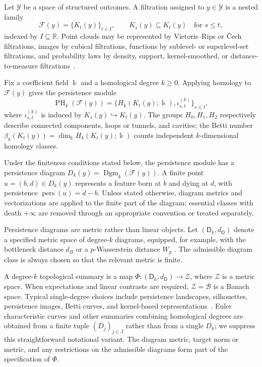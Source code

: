 \documentclass[11pt,a4paper]{article}
\theoremstyle{plain}
\theoremstyle{definition}
\theoremstyle{remark}
\newcommand{\1}{\mathbbm{1}}
\begin{document}
Let \(\mathcal Y\) be a space of structured outcomes. A filtration assigned to \(y\in\mathcal Y\) is a nested family
\[
\mathcal F(y)=\{K_t(y)\}_{t\in I},
\qquad
K_s(y)\subseteq K_t(y)\quad\text{for }s\leq t,
\]
indexed by \(I\subseteq\mathbb R\). Point clouds may be represented by Vietoris--Rips or \v{C}ech filtrations, images by cubical filtrations, functions by sublevel- or superlevel-set filtrations, and probability laws by density, support, kernel-smoothed, or distance-to-measure
filtrations~\citep{edelsbrunnerharer2010,oudot2015,
boissonnatchazalyvinec2018,chazalmichel2021}.

Fix a coefficient field \(\Bbbk\) and a homological degree \(k\geq0\). Applying homology to \(\mathcal F(y)\) gives the persistence module
\[
\operatorname{PH}_k(\mathcal F(y))
=
\bigl\{
H_k(K_t(y);\Bbbk),\iota_{s,t}^{(k)}
\bigr\}_{s\leq t},
\]
where \(\iota_{s,t}^{(k)}\) is induced by \(K_s(y)\hookrightarrow K_t(y)\). The groups \(H_0,H_1,H_2\)
respectively describe connected components, loops or tunnels, and cavities; the Betti number \(\beta_k(K_t(y))=\dim_{\Bbbk}H_k(K_t(y);\Bbbk)\) counts independent \(k\)-dimensional homology classes.

Under the finiteness conditions stated below, the persistence module has a persistence diagram \(D_k(y) = \operatorname{Dgm}_k(\mathcal F(y))\). A finite point \(u=(b,d)\in D_k(y)\) represents a feature born at \(b\) and dying at \(d\), with persistence \(\operatorname{pers}(u)=d-b\). Unless stated otherwise, diagram metrics and vectorizations are applied to the finite part of the diagram; essential classes with death \(+\infty\) are removed through an appropriate convention or treated separately.

Persistence diagrams are metric rather than linear objects. Let \((\mathsf D_k,d_{\mathsf D})\) denote a specified metric space of degree-\(k\) diagrams, equipped, for example, with the bottleneck distance \(d_B\) or a \(p\)-Wasserstein distance \(W_p\) \citep{cohensteineredelsbrunnerharer2007,mileyko2011,turner2014}. The admissible diagram class is always chosen so that the relevant metric is finite.

A degree-\(k\) topological summary is a map
\(\Phi: (\mathsf D_k,d_{\mathsf D})
\longrightarrow \mathcal Z\), where \(\mathcal Z\) is a metric space. When expectations and linear contrasts are required, \(\mathcal Z=\mathcal B\) is a Banach space. Typical single-degree choices include persistence landscapes, silhouettes, persistence images, Betti curves, and kernel-based representations~\citep{bubenik2015,bubenikdlotko2017,chazal2014stochastic,adams2017,kwitt2015,carriere2017,kusano2018,le2018}. Euler characteristic curves and other summaries combining homological degrees are obtained from a finite tuple
\((D_j)_{j\in J}\) rather than from a single \(D_k\); we suppress this straightforward notational variant. The diagram metric, target norm or metric, and any restrictions on the admissible diagrams form part of the specification of \(\Phi\).
\end{document}
